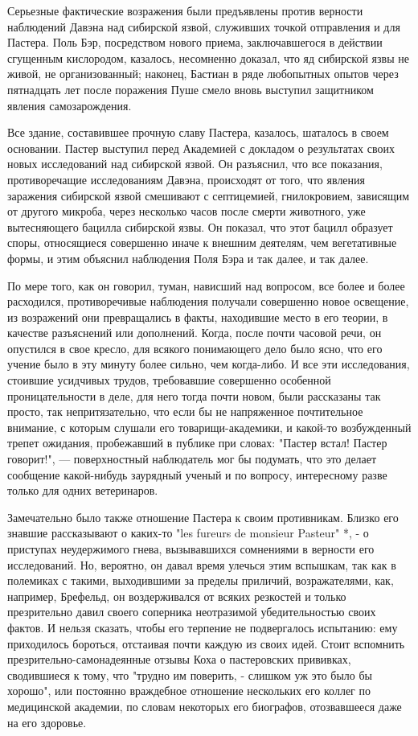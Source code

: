 Серьезные  фактические  возражения  были  предъявлены  против   верности
наблюдений Давэна над  сибирской язвой, служивших  точкой отправления  и
для Пастера.  Поль  Бэр,  посредством нового  приема,  заключавшегося  в
действии сгущенным  кислородом,  казалось, несомненно  доказал,  что  яд
сибирской язвы  не живой,  не организованный;  наконец, Бастиан  в  ряде
любопытных опытов через пятнадцать лет после поражения Пуше смело  вновь
выступил защитником явления самозарождения.

Все здание,  составившее прочную  славу  Пастера, казалось,  шаталось  в
своем  основании.  Пастер   выступил  перед  Академией   с  докладом   о
результатах своих новых исследований над сибирской язвой. Он  разъяснил,
что все показания,  противоречащие исследованиям  Давэна, происходят  от
того, что  явления заражения  сибирской язвой  смешивают с  септицемией,
гнилокровием, зависящим от другого микроба, через несколько часов  после
смерти животного, уже вытесняющего  бацилла сибирской язвы. Он  показал,
что этот бацилл образует споры,  относящиеся совершенно иначе к  внешним
деятелям, чем вегетативные формы, и этим объяснил наблюдения Поля Бэра и
так далее, и так далее.

По мере того, как он говорил, туман, нависший над вопросом, все более  и
более расходился,  противоречивые наблюдения  получали совершенно  новое
освещение, из возражений  они превращались в  факты, находившие место  в
его теории, в  качестве разъяснений или  дополнений. Когда, после  почти
часовой речи, он опустился в  свое кресло, для всякого понимающего  дело
было  ясно,  что  его  учение  было  в  эту  минуту  более  сильно,  чем
когда-либо.  И  все   эти  исследования,   стоившие  усидчивых   трудов,
требовавшие совершенно особенной проницательности в деле, для него тогда
почти новом, были рассказаны так  просто, так непритязательно, что  если
бы  не  напряженное  почтительное   внимание,  с  которым  слушали   его
товарищи-академики, и какой-то возбужденный трепет ожидания, пробежавший
в публике при словах: "Пастер  встал! Пастер говорит!", ---  поверхностный
наблюдатель мог  бы  подумать,  что это  делает  сообщение  какой-нибудь
заурядный ученый  и  по  вопросу, интересному  разве  только  для  одних
ветеринаров.

Замечательно было также  отношение Пастера к  своим противникам.  Близко
его знавшие рассказывают о каких-то "les fureurs de monsieur Pasteur" *,
- о приступах неудержимого гнева, вызывавшихся сомнениями в верности его
исследований. Но, вероятно,  он давал время  улечься этим вспышкам,  так
как  в   полемиках   с   такими,  выходившими   за   пределы   приличий,
возражателями, как,  например,  Брефельд,  он  воздерживался  от  всяких
резкостей и  только  презрительно  давил  своего  соперника  неотразимой
убедительностью своих фактов.  И нельзя сказать,  чтобы его терпение  не
подвергалось испытанию: ему приходилось бороться, отстаивая почти каждую
из своих идей. Стоит вспомнить презрительно-самонадеянные отзывы Коха  о
пастеровских прививках, сводившиеся к тому,  что "трудно им поверить,  -
слишком уж  это  было бы  хорошо",  или постоянно  враждебное  отношение
нескольких его коллег по медицинской  академии, по словам некоторых  его
биографов, отозвавшееся даже на его здоровье.

